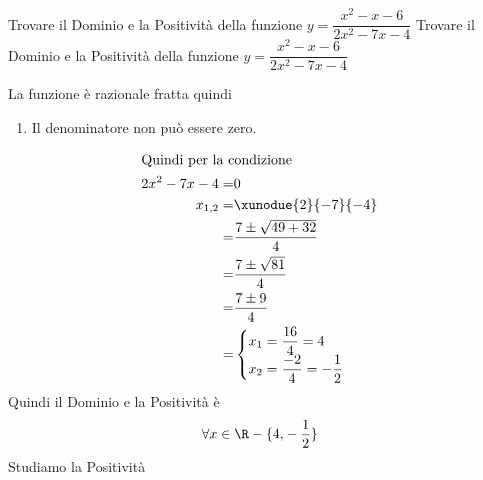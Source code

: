 \begin{exercise}
	Trovare il Dominio e la Positività della funzione $y=\dfrac{x^2-x-6}{2x^2-7x-4}$
	\tcblower
	Trovare il Dominio e la Positività della funzione $y=\dfrac{x^2-x-6}{2x^2-7x-4}$
	
	La funzione è razionale fratta quindi
	\begin{enumerate}
		\item Il denominatore non può essere zero.
	\end{enumerate}
	\begin{align*}
		\intertext{Quindi per la condizione}
		2x^2-7x-4=&0\\
		x_{1,2}=&\xunodue{2}{-7}{-4}\\
		=&\dfrac{7\pm\sqrt{49+32}}{4}\\
		=&\dfrac{7\pm \sqrt{81}}{4}\\
		=&\dfrac{7\pm 9}{4}\\
		=&\begin{cases}
			x_1=\dfrac{16}{4}=4\\
			x_2=\dfrac{-2}{4}=-\dfrac{1}{2}
		\end{cases}\\
	\end{align*}
	Quindi il Dominio e la Positività è 
	\begin{align*}
		\forall x\in\R-\lbrace 4,&-\dfrac{1}{2}\rbrace\\
	\end{align*}
	Studiamo la Positività
	

\end{exercise}
